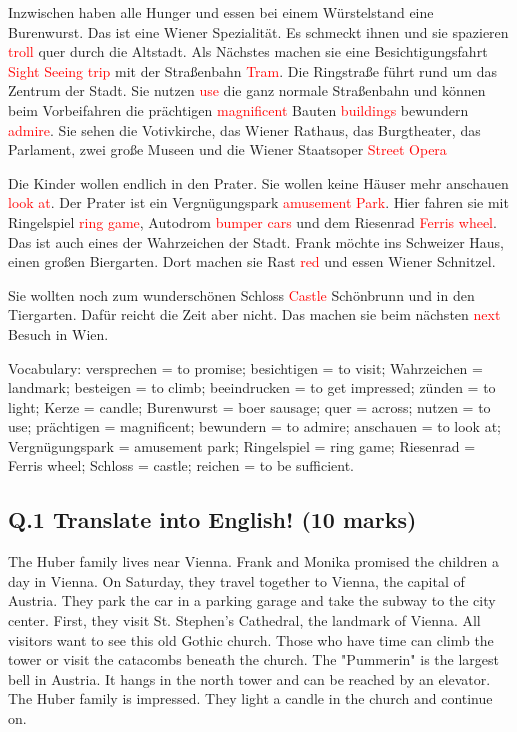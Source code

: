 \documentclass[a4paper,12pt]{article}
\begin{document}
Inzwischen haben alle Hunger und essen bei einem Würstelstand eine Burenwurst. Das ist eine Wiener Spezialität. Es schmeckt ihnen und sie spazieren \textcolor{red}{troll} quer durch die Altstadt. Als Nächstes machen sie eine Besichtigungsfahrt \textcolor{red}{Sight Seeing trip} mit der Straßenbahn \textcolor{red}{Tram}. Die Ringstraße führt rund um das Zentrum der Stadt. Sie nutzen \textcolor{red}{use} die ganz normale Straßenbahn und können beim Vorbeifahren die prächtigen \textcolor{red}{magnificent} Bauten \textcolor{red}{buildings} bewundern \textcolor{red}{admire}. Sie sehen die Votivkirche, das Wiener Rathaus, das Burgtheater, das Parlament, zwei große Museen und die Wiener Staatsoper \textcolor{red}{Street Opera}

Die Kinder wollen endlich in den Prater. Sie wollen keine Häuser mehr anschauen \textcolor{red}{look at}. Der Prater ist ein Vergnügungspark \textcolor{red}{amusement Park}. Hier fahren sie mit Ringelspiel \textcolor{red}{ring game}, Autodrom \textcolor{red}{bumper cars} und dem Riesenrad \textcolor{red}{Ferris wheel}. Das ist auch eines der Wahrzeichen der Stadt. Frank möchte ins Schweizer Haus, einen großen Biergarten. Dort machen sie Rast \textcolor{red}{red} und essen Wiener Schnitzel.

Sie wollten noch zum wunderschönen Schloss \textcolor{red}{Castle} Schönbrunn und in den Tiergarten. Dafür reicht die Zeit aber nicht. Das machen sie beim nächsten \textcolor{red}{next} Besuch in Wien.

\vspace{0.5cm}

Vocabulary: 
versprechen = to promise; besichtigen = to visit; Wahrzeichen = landmark; besteigen = to climb; beeindrucken = to get impressed; zünden = to light; Kerze = candle; Burenwurst = boer sausage; quer = across; nutzen = to use; prächtigen = magnificent; bewundern = to admire; anschauen = to look at; Vergnügungspark = amusement park; Ringelspiel = ring game; Riesenrad = Ferris wheel; Schloss = castle; reichen = to be sufficient.

\subsection*{Q.1 Translate into English! (10 marks)}

The Huber family lives near Vienna. Frank and Monika promised the children a day in Vienna. On Saturday, they travel together to Vienna, the capital of Austria. They park the car in a parking garage and take the subway to the city center. First, they visit St. Stephen's Cathedral, the landmark of Vienna. All visitors want to see this old Gothic church. Those who have time can climb the tower or visit the catacombs beneath the church. The "Pummerin" is the largest bell in Austria. It hangs in the north tower and can be reached by an elevator. The Huber family is impressed. They light a candle in the church and continue on.
\end{document}

